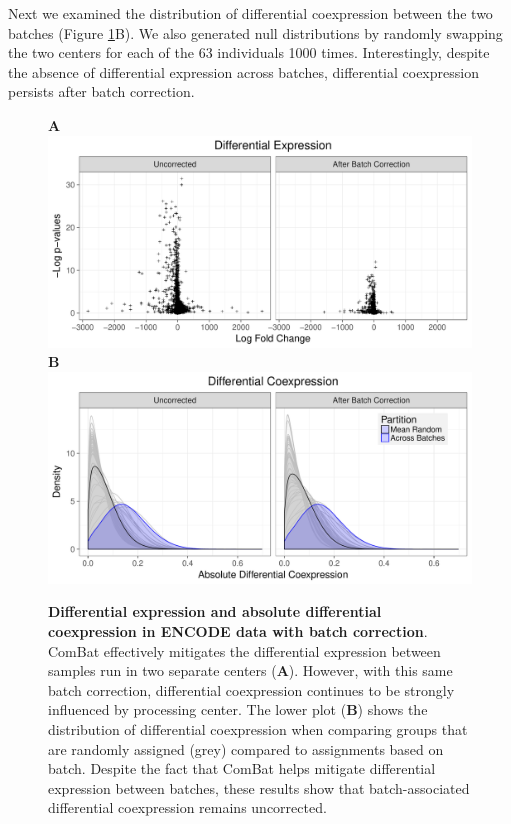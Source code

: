 Next we examined the distribution of differential coexpression between
the two batches (Figure \ref{ENCODE}B). We also generated null distributions
by randomly swapping the two centers for each of the 63 individuals
1000 times. Interestingly, despite the absence of differential expression
across batches, differential coexpression persists after batch correction.

\begin{figure}
\textbf{A}\includegraphics[width=1\columnwidth]{figures/encode_diffexpress}\\
\textbf{B}\includegraphics[width=1\columnwidth]{figures/encode_diff_coex_density}\caption[Differential expression and absolute differential coexpression in
ENCODE data with batch correction]{\textbf{Differential expression and absolute differential coexpression in
ENCODE data with batch correction}. ComBat effectively mitigates the
differential expression between samples run in two separate centers
(\textbf{A}). However, with this same batch correction, differential
coexpression continues to be strongly influenced by processing center.
The lower plot (\textbf{B}) shows the distribution of differential
coexpression when comparing groups that are randomly assigned (grey)
compared to assignments based on batch. Despite the fact that ComBat
helps mitigate differential expression between batches, these results
show that batch-associated differential coexpression remains uncorrected.}
\label{ENCODE}
\end{figure}


